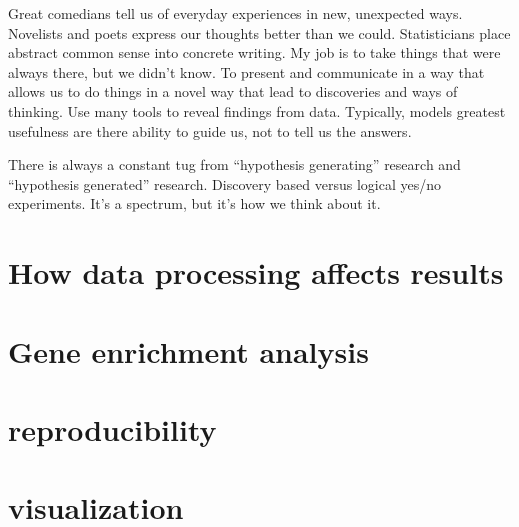 Great comedians tell us of everyday experiences in new, 
unexpected ways. Novelists and poets express our thoughts 
better than we could. Statisticians place abstract common 
sense into concrete writing. My job is to take things that 
were always there, but we didn’t know. To present and 
communicate in a way that allows us to do things in a 
novel way that lead to discoveries and ways of thinking.  
Use many tools to reveal findings from data. Typically, 
models greatest usefulness are there ability to guide us, 
not to tell us the answers.


There is always a constant tug from “hypothesis generating” 
research and “hypothesis generated” research. Discovery 
based versus logical yes/no experiments. It’s a spectrum, 
but it’s how we think about it.





\section{How data processing affects results}

\section{Gene enrichment analysis}

\section{reproducibility}

\section{visualization}